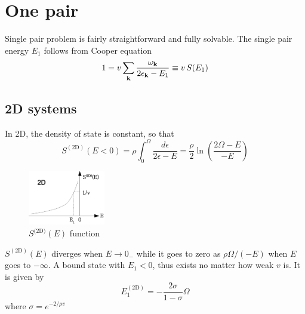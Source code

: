 \documentclass{article}
\newcommand{\td}{{\ensuremath{{\text{(2D)}}}}}
\begin{document}
\section{One pair\label{sec:onePair}}
Single pair problem is fairly straightforward and fully solvable.  The single pair energy $E_1$ follows from Cooper equation
\begin{equation}
1=v\sum_{\mathbf{k}}\frac{\omega_{\mathbf{k}}}{2\epsilon_{\mathbf{k}}-E_1}\equiv{}v\,S(E_1)
\label{eq:onePair}
\end{equation}
\subsection{2D systems}
In 2D, the density of state is constant, so that 
\begin{equation}
S^{(\text{2D})}(E<0)=\rho\int_0^{\Omega}\frac{d\epsilon}{2\epsilon-E}=\frac{\rho}{2}\ln\left(\frac{2\Omega-E}{-E}\right)
\label{eq:}
\end{equation}
\begin{figure}[htbp]
	\centering
		\includegraphics[width=0.30\textwidth]{2dOnePair.eps}
	\caption{$S^\td(E)$ function}
	\label{fig:2dOnePair}
\end{figure}

$S^{(\text{2D})}(E)$ diverges when $E\rightarrow{}0_{-}$ while it goes to zero as $\rho\Omega/(-E)$ when $E$ goes to $-\infty$. A bound state with $E_1<0$, thus exists no matter how weak $v$ is. It is given by 
\begin{equation}
E_1^{(\text{2D})}=-\frac{2\sigma}{1-\sigma}\Omega
\label{eq:}
\end{equation}
where $\sigma=e^{-2/\rho{v}}$
\end{document}
